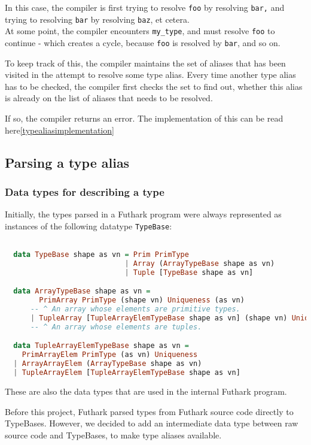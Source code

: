 \begin{enumerate}
    In this case, the compiler is first trying to resolve \texttt{foo} by
    resolving \texttt{bar,} and trying to resolving \texttt{bar} by resolving \texttt{baz}, et cetera. \\
    At some point, the compiler encounters \texttt{my_type}, and must resolve \texttt{foo} to
    continue - which creates a cycle, because \texttt{foo} is resolved by \texttt{bar}, and so on.

    To keep track of this, the compiler maintains the set of aliases that has
    been visited in the attempt to resolve some type alias. Every time another
    type alias has to be checked, the compiler first checks the set to find out,
    whether this alias is already on the list of aliases that needs to be
    resolved.

    If so, the compiler returns an error.
    The implementation of this can be read here\ref{typealiasimplementation}
\end{enumerate}
\subsection{Parsing a type alias}
\subsubsection{Data types for describing a type}
Initially, the types parsed in a Futhark program were always represented as instances of the
following datatype \texttt{TypeBase}:
\begin{lstlisting}[language=Haskell]

  data TypeBase shape as vn = Prim PrimType
                            | Array (ArrayTypeBase shape as vn)
                            | Tuple [TypeBase shape as vn]

  data ArrayTypeBase shape as vn =
        PrimArray PrimType (shape vn) Uniqueness (as vn)
      -- ^ An array whose elements are primitive types.
      | TupleArray [TupleArrayElemTypeBase shape as vn] (shape vn) Uniqueness
      -- ^ An array whose elements are tuples.

  data TupleArrayElemTypeBase shape as vn =
    PrimArrayElem PrimType (as vn) Uniqueness
  | ArrayArrayElem (ArrayTypeBase shape as vn)
  | TupleArrayElem [TupleArrayElemTypeBase shape as vn]
\end{lstlisting}

These are also the data types that are used in the internal Futhark program.

Before this project, Futhark parsed types from Futhark source code directly to
TypeBases.
However, we decided to add an intermediate data type between raw source
code and TypeBases, to make type aliases available.

